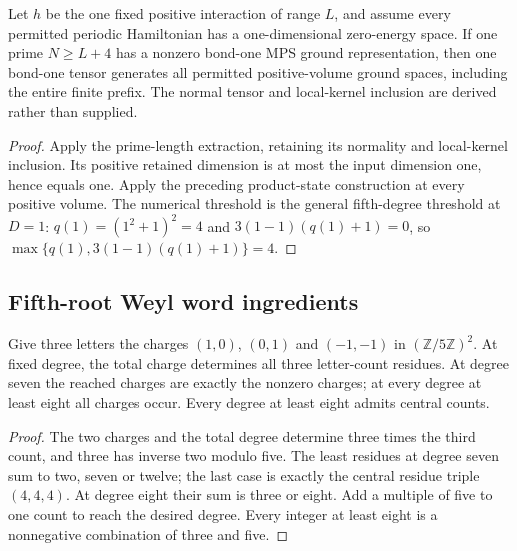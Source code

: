\begin{lemma}
    \label{lem:spwc_bond_one_prime_ground_family}
    \leanok
    Let $h$ be the one fixed positive interaction of range $L$, and
    assume every permitted periodic Hamiltonian has a one-dimensional
    zero-energy space. If one prime $N\geq L+4$ has a nonzero
    bond-one MPS ground representation, then one bond-one tensor
    generates all permitted positive-volume ground spaces, including
    the entire finite prefix. The normal tensor and local-kernel
    inclusion are derived rather than supplied.
\end{lemma}
\begin{proof}\leanok
    Apply the prime-length extraction, retaining its normality
    and local-kernel inclusion. Its positive retained dimension is at
    most the input dimension one, hence equals one. Apply the preceding
    product-state construction at every positive volume. The numerical
    threshold is the general fifth-degree threshold at $D=1$:
    $q(1)=(1^2+1)^2=4$ and $3(1-1)(q(1)+1)=0$, so
    $\max\{q(1),3(1-1)(q(1)+1)\}=4$.
\end{proof}

\subsection{Fifth-root Weyl word ingredients}
\label{sec:short_volume_weyl_words}

\begin{lemma}
    \label{lem:short_volume_weyl_charges}
    \leanok
    Give three letters the charges $(1,0)$, $(0,1)$ and $(-1,-1)$
    in $(\mathbb Z/5\mathbb Z)^2$. At fixed degree, the total charge
    determines all three letter-count residues. At degree seven the
    reached charges are exactly the nonzero charges; at every degree
    at least eight all charges occur. Every degree at least eight admits
    central counts.
\end{lemma}
\begin{proof}\leanok
    The two charges and the total degree determine three times the
    third count, and three has inverse two modulo five. The least
    residues at degree seven sum to two, seven or twelve; the last
    case is exactly the central residue triple $(4,4,4)$.
    At degree eight their sum is three or eight. Add a multiple of five
    to one count to reach the desired degree. Every integer at least
    eight is a nonnegative combination of three and five.
\end{proof}

